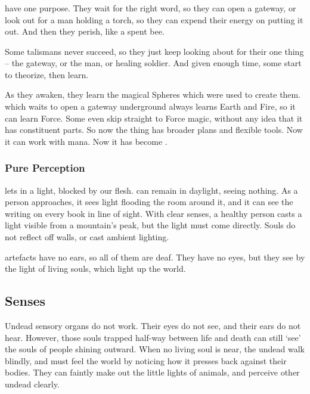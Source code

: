 \begin{multicols}{2}

\subsubsection{}
\begin{exampletext}
  have one purpose.
  They wait for the right word, so they can open a gateway, or look out for a man holding a torch, so they can expend their energy on putting it out.
  And then they perish, like a spent bee.

  Some \glspl{talisman} never succeed, so they just keep looking about for their one thing -- the gateway, or the man, or healing  soldier.
  And given enough time, some start to theorize, then learn.

  As they awaken, they learn the magical Spheres which were used to create them.
   which waits to open a gateway underground always learns Earth and Fire, so it can learn Force.
  Some even skip straight to Force magic, without any idea that it has constituent parts.
  So now the thing has broader plans and flexible tools.
  Now it can work with mana.
  Now it has become .
\end{exampletext}

\subsubsection{Pure Perception}
lets in a light, blocked by our flesh.
 can remain in daylight, seeing nothing.
As a person approaches, it sees light flooding the room around it, and it can see the writing on every book in line of sight.
With clear senses, a healthy person casts a light visible from a mountain's peak, but the light must come directly.
Souls do not reflect off walls, or cast ambient lighting.

\Glspl{artefact} have no ears, so all of them are deaf.
They have no eyes, but they see by the light of living souls, which light up the world.

\subsection[The undead are deaf and blind, but see by the light of living souls]{Senses}
\label{undead_senses}
\label{artefact_senses}

Undead sensory organs do not work.
Their eyes do not see, and their ears do not hear.
However, those souls trapped half-way between life and death can still `see' the souls of people shining outward.
When no living soul is near, the undead walk blindly, and must feel the world by noticing how it presses back against their bodies.
They can faintly make out the little lights of animals, and perceive other undead clearly.


\end{multicols}
